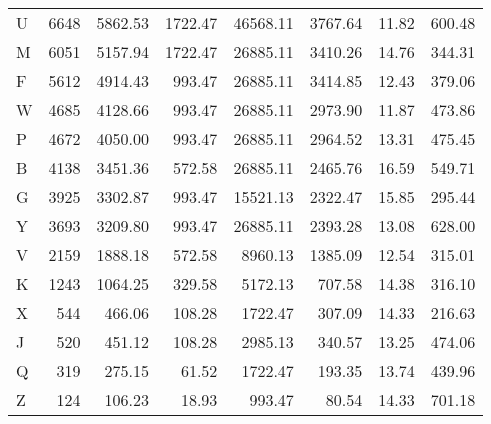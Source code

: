 \begin{tabular}{lrrrrrrr}
     U &          6648 &           5862.53 &           1722.47 &          46568.11 &             3767.64 &                   11.82 &                  600.48 \\
     M &          6051 &           5157.94 &           1722.47 &          26885.11 &             3410.26 &                   14.76 &                  344.31 \\
     F &          5612 &           4914.43 &            993.47 &          26885.11 &             3414.85 &                   12.43 &                  379.06 \\
     W &          4685 &           4128.66 &            993.47 &          26885.11 &             2973.90 &                   11.87 &                  473.86 \\
     P &          4672 &           4050.00 &            993.47 &          26885.11 &             2964.52 &                   13.31 &                  475.45 \\
     B &          4138 &           3451.36 &            572.58 &          26885.11 &             2465.76 &                   16.59 &                  549.71 \\
     G &          3925 &           3302.87 &            993.47 &          15521.13 &             2322.47 &                   15.85 &                  295.44 \\
     Y &          3693 &           3209.80 &            993.47 &          26885.11 &             2393.28 &                   13.08 &                  628.00 \\
     V &          2159 &           1888.18 &            572.58 &           8960.13 &             1385.09 &                   12.54 &                  315.01 \\
     K &          1243 &           1064.25 &            329.58 &           5172.13 &              707.58 &                   14.38 &                  316.10 \\
     X &           544 &            466.06 &            108.28 &           1722.47 &              307.09 &                   14.33 &                  216.63 \\
     J &           520 &            451.12 &            108.28 &           2985.13 &              340.57 &                   13.25 &                  474.06 \\
     Q &           319 &            275.15 &             61.52 &           1722.47 &              193.35 &                   13.74 &                  439.96 \\
     Z &           124 &            106.23 &             18.93 &            993.47 &               80.54 &                   14.33 &                  701.18 \\
\bottomrule
\end{tabular}
